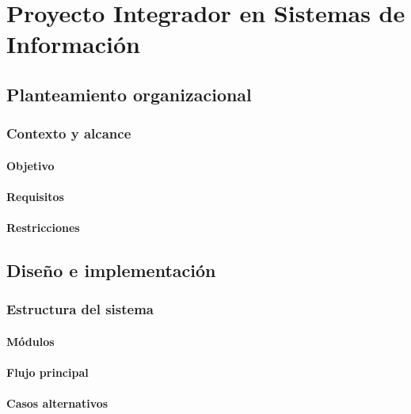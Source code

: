 \documentclass[12pt,twoside]{book}
\begin{document}
	\chapter{Proyecto Integrador en Sistemas de Información}
	
	\section{Planteamiento organizacional}
	
	\subsection{Contexto y alcance}
	
	\subsubsection{Objetivo}
	
	\subsubsection{Requisitos}
	
	\subsubsection{Restricciones}
	
	\section{Diseño e implementación}
	
	\subsection{Estructura del sistema}
	
	\subsubsection{Módulos}
	
	\subsubsection{Flujo principal}
	
	\subsubsection{Casos alternativos}
		
\end{document}
